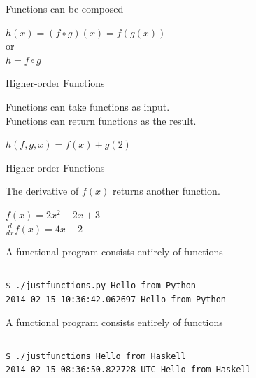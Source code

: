 \documentclass[mathserif]{beamer}
\begin{document}
\begin{frame}{Functions can be composed}

  {\Huge $h(x) = (f \circ g)(x) = f(g(x))$\\
  \vskip5mm
  or\\
  \vskip5mm
  $h = f \circ g$}

\end{frame}

\begin{frame}{Higher-order Functions}

  {\Large Functions can take functions as input.}\\
  {\Large Functions can return functions as the result.}

  \vskip5mm

  {\Huge $h(f, g, x) = f(x) + g(2)$}

\end{frame}

\begin{frame}{Higher-order Functions}

  {\Large The derivative of $f(x)$ returns another function.}

  \vskip5mm

  {\Large $f(x) = 2x^2 - 2x + 3$}\\
  {\Large $\frac{d}{dx} f(x) = 4x - 2$}


\end{frame}

\begin{frame}[fragile]{A functional program consists entirely of functions}

  \inputminted[firstline=6,lastline=15]{python}{code/python/justfunctions.py}

  \begin{verbatim}
$ ./justfunctions.py Hello from Python
2014-02-15 10:36:42.062697 Hello-from-Python
  \end{verbatim}

\end{frame}

\begin{frame}[fragile]{A functional program consists entirely of functions}

  \inputminted[firstline=5]{haskell}{code/haskell/justfunctions.hs}

  \begin{verbatim}
$ ./justfunctions Hello from Haskell
2014-02-15 08:36:50.822728 UTC Hello-from-Haskell
  \end{verbatim}

\end{frame}
\end{document}
